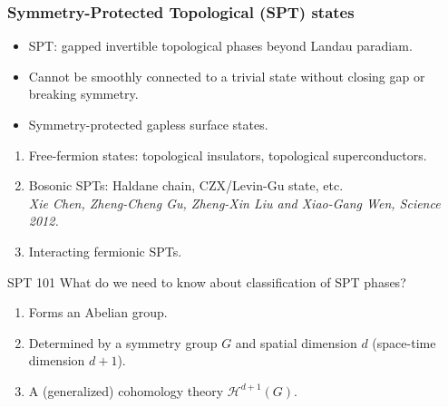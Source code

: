 \documentclass[xcolor=table, 10pt, aspectratio=43]{beamer}
\begin{document}
\begin{frame}
  \frametitle{Symmetry-Protected Topological (SPT) states}
\begin{itemize}
\item SPT: gapped invertible topological phases beyond Landau paradiam.
\item Cannot be smoothly connected to a trivial state without closing gap or breaking symmetry.
\item Symmetry-protected gapless surface states.
\end{itemize}
\begin{enumerate}
	\item Free-fermion states: topological insulators, topological superconductors.
	\item Bosonic SPTs: Haldane chain, CZX/Levin-Gu state, etc.\\
	\emph{Xie Chen, Zheng-Cheng Gu, Zheng-Xin Liu and Xiao-Gang Wen, Science 2012.}
	\item Interacting fermionic SPTs.
\end{enumerate}
\end{frame}

\begin{frame}{SPT 101}
	What do we need to know about classification of SPT phases?
	\begin{enumerate}
		\item Forms an Abelian group.
		\item Determined by a symmetry group $G$ and spatial dimension $d$ (space-time dimension $d+1$).
		\item A (generalized) cohomology theory $\mathcal H^{d+1}(G)$.
	\end{enumerate}
\end{frame}
\end{document}
